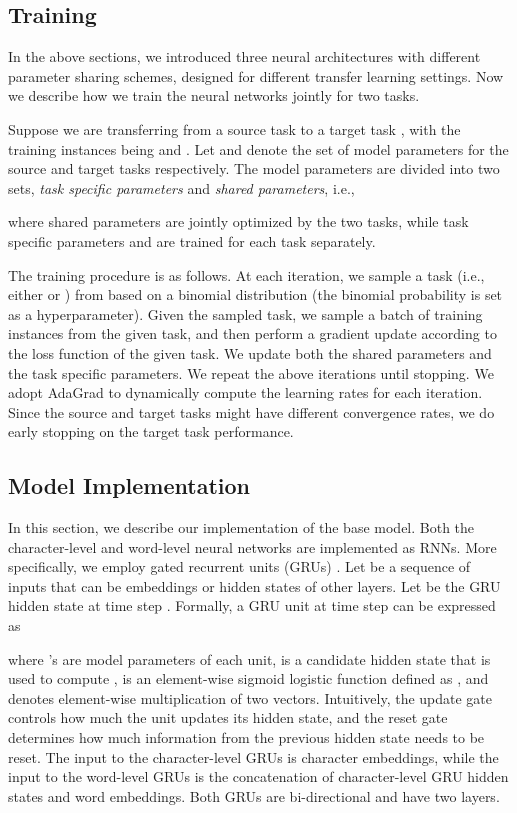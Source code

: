 \documentclass{article} \usepackage{iclr2017_conference,times}
\begin{document}
\subsection{Training}

In the above sections, we introduced three neural architectures with different parameter sharing schemes, designed for different transfer learning settings. Now we describe how we train the neural networks jointly for two tasks.

Suppose we are transferring from a source task  to a target task , with the training instances being  and . Let  and  denote the set of model parameters for the source and target tasks respectively. The model parameters are divided into two sets, \textit{task specific parameters} and \textit{shared parameters}, i.e.,

where shared parameters  are jointly optimized by the two tasks, while task specific parameters  and  are trained for each task separately.

The training procedure is as follows. At each iteration, we sample a task (i.e., either  or ) from  based on a binomial distribution (the binomial probability is set as a hyperparameter). Given the sampled task, we sample a batch of training instances from the given task, and then perform a gradient update according to the loss function of the given task. We update both the shared parameters and the task specific parameters. We repeat the above iterations until stopping. We adopt AdaGrad \citep{duchi2011adaptive} to dynamically compute the learning rates for each iteration. Since the source and target tasks might have different convergence rates, we do early stopping on the target task performance.

\subsection{Model Implementation} \label{sec:imp}

In this section, we describe our implementation of the base model. Both the character-level and word-level neural networks are implemented as RNNs. More specifically, we employ gated recurrent units (GRUs) \citep{cho2014properties}. Let  be a sequence of inputs that can be embeddings or hidden states of other layers. Let  be the GRU hidden state at time step . Formally, a GRU unit at time step  can be expressed as

where 's are model parameters of each unit,  is a candidate hidden state that is used to compute ,  is an element-wise sigmoid logistic function defined as , and  denotes element-wise multiplication of two vectors. Intuitively, the update gate  controls how much the unit updates its hidden state, and the reset gate  determines how much information from the previous hidden state needs to be reset. The input to the character-level GRUs is character embeddings, while the input to the word-level GRUs is the concatenation of character-level GRU hidden states and word embeddings. Both GRUs are bi-directional and have two layers.
\end{document}
